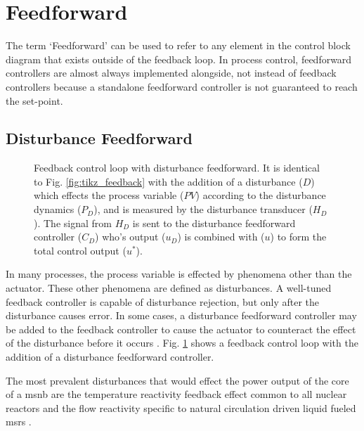 \section{Feedforward}
The term `Feedforward' can be used to refer to any element in the control block diagram that exists outside of the feedback loop. In process control, feedforward controllers are almost always implemented alongside, not instead of feedback controllers because a standalone feedforward controller is not guaranteed to reach the set-point.

\subsection{Disturbance Feedforward}
\begin{figure}[!ht]
    \centering
    
    \caption[Feedback control loop with disturbance feedforward]{Feedback control loop with disturbance feedforward. It is identical to Fig. \ref{fig:tikz_feedback} with the addition of a disturbance ($D$) which effects the process variable ($PV$) according to the disturbance dynamics ($P_D$), and is measured by the disturbance transducer ($H_D$). The signal from $H_D$ is sent to the disturbance feedforward controller ($C_D$) who's output ($u_D$) is combined with ($u$) to form the total control output ($u^*$).}
    \label{fig:tikz_feedforward}
\end{figure}

In many processes, the process variable is effected by phenomena other than the actuator. These other phenomena are defined as disturbances. A well-tuned feedback controller is capable of disturbance rejection, but only after the disturbance causes error. In some cases, a disturbance feedforward controller may be added to the feedback controller to cause the actuator to counteract the effect of the disturbance before it occurs \cite[Ch. 10]{Bequette}. Fig. \ref{fig:tikz_feedforward} shows a feedback control loop with the addition of a disturbance feedforward controller.

The most prevalent disturbances that would effect the power output of the core of a \acs{msnb} are the temperature reactivity feedback effect common to all nuclear reactors and the flow reactivity specific to natural circulation driven  liquid fueled \acsp{msr} \cite{CarterNumerical}. 


